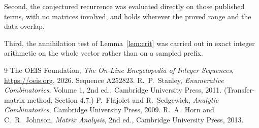 \documentclass[11pt,a4paper]{article}
\theoremstyle{plain}
\theoremstyle{definition}
\begin{document}
Second, the conjectured recurrence was evaluated directly on those published terms, with no
matrices involved, and holds wherever the proved range and the data overlap.

Third, the annihilation test of Lemma~\ref{lem:crit} was carried out in exact integer
arithmetic on the whole vector rather than on a sampled prefix.

\begin{thebibliography}{9}
 The OEIS Foundation, \emph{The On-Line Encyclopedia of Integer
Sequences}, \url{https://oeis.org}, 2026. Sequence A252823.
 R.~P.~Stanley, \emph{Enumerative Combinatorics}, Volume 1, 2nd ed.,
Cambridge University Press, 2011. (Transfer-matrix method, Section 4.7.)
 P.~Flajolet and R.~Sedgewick, \emph{Analytic Combinatorics}, Cambridge
University Press, 2009.
 R.~A.~Horn and C.~R.~Johnson, \emph{Matrix Analysis}, 2nd ed., Cambridge
University Press, 2013.
\end{thebibliography}
\end{document}
